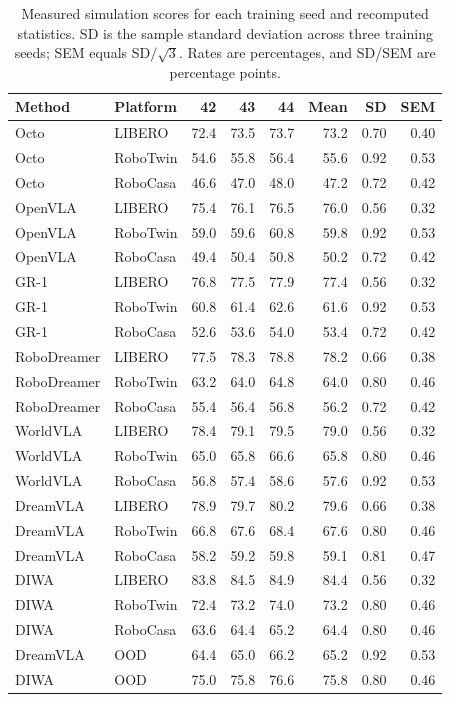 \begin{table}[htbp]
\centering
\caption{Measured simulation scores for each training seed and recomputed statistics. SD is the sample standard deviation across three training seeds; SEM equals SD$/\sqrt{3}$. Rates are percentages, and SD/SEM are percentage points.}
\label{tab:seeds}
\small
\begin{tabular}{llrrrrrr}
\toprule
Method & Platform & 42 & 43 & 44 & Mean & SD & SEM\\
\midrule
Octo & LIBERO & 72.4 & 73.5 & 73.7 & 73.2 & 0.70 & 0.40\\
Octo & RoboTwin & 54.6 & 55.8 & 56.4 & 55.6 & 0.92 & 0.53\\
Octo & RoboCasa & 46.6 & 47.0 & 48.0 & 47.2 & 0.72 & 0.42\\
OpenVLA & LIBERO & 75.4 & 76.1 & 76.5 & 76.0 & 0.56 & 0.32\\
OpenVLA & RoboTwin & 59.0 & 59.6 & 60.8 & 59.8 & 0.92 & 0.53\\
OpenVLA & RoboCasa & 49.4 & 50.4 & 50.8 & 50.2 & 0.72 & 0.42\\
GR-1 & LIBERO & 76.8 & 77.5 & 77.9 & 77.4 & 0.56 & 0.32\\
GR-1 & RoboTwin & 60.8 & 61.4 & 62.6 & 61.6 & 0.92 & 0.53\\
GR-1 & RoboCasa & 52.6 & 53.6 & 54.0 & 53.4 & 0.72 & 0.42\\
RoboDreamer & LIBERO & 77.5 & 78.3 & 78.8 & 78.2 & 0.66 & 0.38\\
RoboDreamer & RoboTwin & 63.2 & 64.0 & 64.8 & 64.0 & 0.80 & 0.46\\
RoboDreamer & RoboCasa & 55.4 & 56.4 & 56.8 & 56.2 & 0.72 & 0.42\\
WorldVLA & LIBERO & 78.4 & 79.1 & 79.5 & 79.0 & 0.56 & 0.32\\
WorldVLA & RoboTwin & 65.0 & 65.8 & 66.6 & 65.8 & 0.80 & 0.46\\
WorldVLA & RoboCasa & 56.8 & 57.4 & 58.6 & 57.6 & 0.92 & 0.53\\
DreamVLA & LIBERO & 78.9 & 79.7 & 80.2 & 79.6 & 0.66 & 0.38\\
DreamVLA & RoboTwin & 66.8 & 67.6 & 68.4 & 67.6 & 0.80 & 0.46\\
DreamVLA & RoboCasa & 58.2 & 59.2 & 59.8 & 59.1 & 0.81 & 0.47\\
DIWA & LIBERO & 83.8 & 84.5 & 84.9 & 84.4 & 0.56 & 0.32\\
DIWA & RoboTwin & 72.4 & 73.2 & 74.0 & 73.2 & 0.80 & 0.46\\
DIWA & RoboCasa & 63.6 & 64.4 & 65.2 & 64.4 & 0.80 & 0.46\\
DreamVLA & OOD & 64.4 & 65.0 & 66.2 & 65.2 & 0.92 & 0.53\\
DIWA & OOD & 75.0 & 75.8 & 76.6 & 75.8 & 0.80 & 0.46\\
\bottomrule
\end{tabular}
\end{table}
